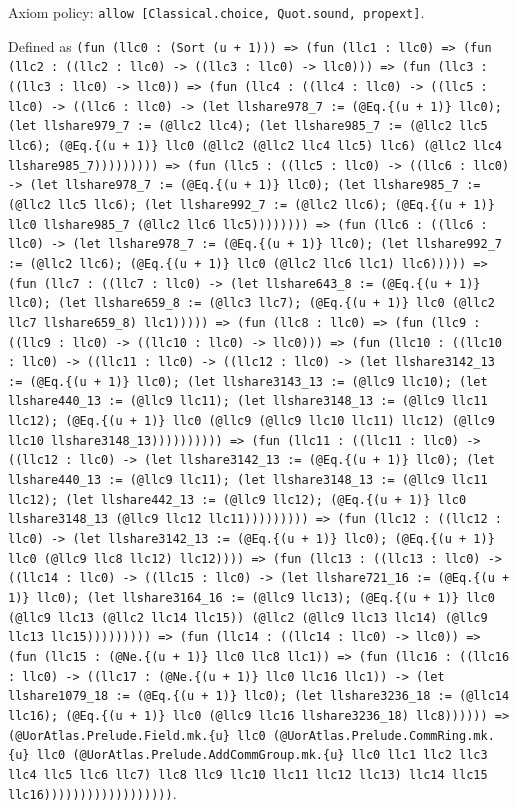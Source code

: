 \documentclass[11pt]{article}
\begin{document}
\noindent Axiom policy: \texttt{allow [Classical.choice, Quot.sound, propext]}.\par
\noindent Defined as \texttt{(fun (llc0 : (Sort (u + 1))) => (fun (llc1 : llc0) => (fun (llc2 : ((llc2 : llc0) -> ((llc3 : llc0) -> llc0))) => (fun (llc3 : ((llc3 : llc0) -> llc0)) => (fun (llc4 : ((llc4 : llc0) -> ((llc5 : llc0) -> ((llc6 : llc0) -> (let llshare978\_7 := (@Eq.\{(u + 1)\} llc0); (let llshare979\_7 := (@llc2 llc4); (let llshare985\_7 := (@llc2 llc5 llc6); (@Eq.\{(u + 1)\} llc0 (@llc2 (@llc2 llc4 llc5) llc6) (@llc2 llc4 llshare985\_7))))))))) => (fun (llc5 : ((llc5 : llc0) -> ((llc6 : llc0) -> (let llshare978\_7 := (@Eq.\{(u + 1)\} llc0); (let llshare985\_7 := (@llc2 llc5 llc6); (let llshare992\_7 := (@llc2 llc6); (@Eq.\{(u + 1)\} llc0 llshare985\_7 (@llc2 llc6 llc5)))))))) => (fun (llc6 : ((llc6 : llc0) -> (let llshare978\_7 := (@Eq.\{(u + 1)\} llc0); (let llshare992\_7 := (@llc2 llc6); (@Eq.\{(u + 1)\} llc0 (@llc2 llc6 llc1) llc6))))) => (fun (llc7 : ((llc7 : llc0) -> (let llshare643\_8 := (@Eq.\{(u + 1)\} llc0); (let llshare659\_8 := (@llc3 llc7); (@Eq.\{(u + 1)\} llc0 (@llc2 llc7 llshare659\_8) llc1))))) => (fun (llc8 : llc0) => (fun (llc9 : ((llc9 : llc0) -> ((llc10 : llc0) -> llc0))) => (fun (llc10 : ((llc10 : llc0) -> ((llc11 : llc0) -> ((llc12 : llc0) -> (let llshare3142\_13 := (@Eq.\{(u + 1)\} llc0); (let llshare3143\_13 := (@llc9 llc10); (let llshare440\_13 := (@llc9 llc11); (let llshare3148\_13 := (@llc9 llc11 llc12); (@Eq.\{(u + 1)\} llc0 (@llc9 (@llc9 llc10 llc11) llc12) (@llc9 llc10 llshare3148\_13)))))))))) => (fun (llc11 : ((llc11 : llc0) -> ((llc12 : llc0) -> (let llshare3142\_13 := (@Eq.\{(u + 1)\} llc0); (let llshare440\_13 := (@llc9 llc11); (let llshare3148\_13 := (@llc9 llc11 llc12); (let llshare442\_13 := (@llc9 llc12); (@Eq.\{(u + 1)\} llc0 llshare3148\_13 (@llc9 llc12 llc11))))))))) => (fun (llc12 : ((llc12 : llc0) -> (let llshare3142\_13 := (@Eq.\{(u + 1)\} llc0); (@Eq.\{(u + 1)\} llc0 (@llc9 llc8 llc12) llc12)))) => (fun (llc13 : ((llc13 : llc0) -> ((llc14 : llc0) -> ((llc15 : llc0) -> (let llshare721\_16 := (@Eq.\{(u + 1)\} llc0); (let llshare3164\_16 := (@llc9 llc13); (@Eq.\{(u + 1)\} llc0 (@llc9 llc13 (@llc2 llc14 llc15)) (@llc2 (@llc9 llc13 llc14) (@llc9 llc13 llc15))))))))) => (fun (llc14 : ((llc14 : llc0) -> llc0)) => (fun (llc15 : (@Ne.\{(u + 1)\} llc0 llc8 llc1)) => (fun (llc16 : ((llc16 : llc0) -> ((llc17 : (@Ne.\{(u + 1)\} llc0 llc16 llc1)) -> (let llshare1079\_18 := (@Eq.\{(u + 1)\} llc0); (let llshare3236\_18 := (@llc14 llc16); (@Eq.\{(u + 1)\} llc0 (@llc9 llc16 llshare3236\_18) llc8)))))) => (@UorAtlas.Prelude.Field.mk.\{u\} llc0 (@UorAtlas.Prelude.CommRing.mk.\{u\} llc0 (@UorAtlas.Prelude.AddCommGroup.mk.\{u\} llc0 llc1 llc2 llc3 llc4 llc5 llc6 llc7) llc8 llc9 llc10 llc11 llc12 llc13) llc14 llc15 llc16))))))))))))))))))}.\par
\end{document}
